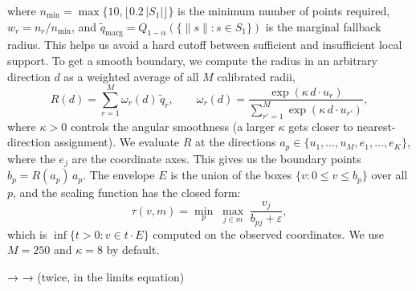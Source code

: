 where $n_{\min}=\max\{10,\lfloor 0.2\,|S_1|\rfloor\}$ is the minimum number of points required, $w_r=n_r/n_{\min}$, and 
$\tilde q_{\mathrm{marg}}=Q_{1-\alpha}(\{\|s\|:s\in S_1\})$ is the marginal fallback radius. This helps us avoid a hard 
cutoff between sufficient and insufficient local support. To get a smooth boundary, we compute the radius in an arbitrary direction 
$d$ as a weighted average of all $M$ calibrated radii,
\begin{equation}\label{eq:smooth}
R(d)=\sum_{r=1}^{M}\omega_r(d)\,\tilde q_r,\qquad
\omega_r(d)=\frac{\exp(\kappa\,d\cdot u_r)}{\sum_{r'=1}^{M}\exp(\kappa\,d\cdot u_{r'})},
\end{equation}
where $\kappa>0$ controls the angular smoothness (a larger $\kappa$ gets closer to nearest-direction assignment). We evaluate $R$ 
at the directions $a_p\in\{u_1,\dots,u_M,e_1,\dots,e_K\}$, where the $e_j$ are the coordinate axes. This gives us the boundary points 
$b_p=R(a_p)\,a_p$. The envelope $E$ is the union of the boxes $\{v:0\le v\le b_p\}$ over all $p$, and the scaling function has the 
closed form:
\begin{equation}\label{eq:radial}
\tau(v,m)=\min_{p}\;\max_{j\in m}\;\frac{v_j}{b_{pj}+\varepsilon},
\end{equation}
which is $\inf\{t>0:v\in t\cdot E\}$ computed on the observed coordinates. We use $M=250$ and $\kappa=8$ by default.


 → 
 →  (twice, in the limits equation)

